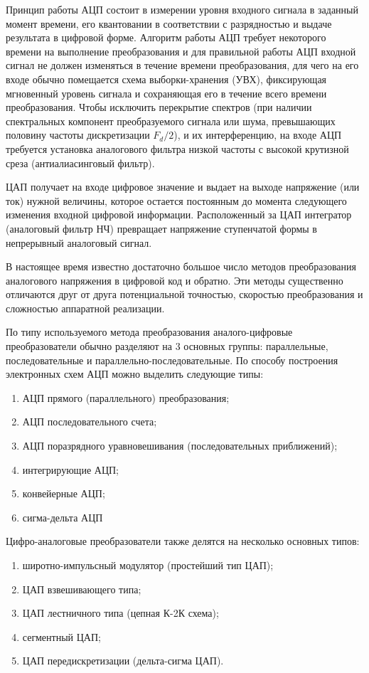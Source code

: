 Принцип работы АЦП состоит в измерении уровня входного сигнала в заданный момент времени, его квантовании в соответствии с разрядностью и выдаче результата в цифровой форме. Алгоритм работы АЦП требует некоторого времени на выполнение преобразования и для правильной работы АЦП входной сигнал не должен изменяться в течение времени преобразования, для чего на его входе обычно помещается схема выборки-хранения (УВХ), фиксирующая мгновенный уровень сигнала и сохраняющая его в течение всего времени преобразования. Чтобы исключить перекрытие спектров (при наличии спектральных компонент преобразуемого сигнала или шума, превышающих половину частоты дискретизации $F_d / 2$), и их интерференцию, на входе АЦП требуется установка аналогового фильтра низкой частоты с высокой крутизной среза (антиалиасинговый фильтр).

ЦАП получает на входе цифровое значение и выдает на выходе напряжение (или ток) нужной величины, которое остается постоянным до момента следующего изменения входной цифровой информации. Расположенный за ЦАП интегратор (аналоговый фильтр НЧ) превращает напряжение ступенчатой формы в непрерывный аналоговый сигнал.

В настоящее время известно достаточно большое число методов преобразования аналогового напряжения в цифровой код и обратно. Эти методы существенно отличаются друг от друга потенциальной точностью, скоростью преобразования и сложностью аппаратной реализации.

По типу используемого метода преобразования аналого-цифровые преобразователи обычно разделяют на 3 основных группы: параллельные, последовательные и параллельно-последовательные. По способу построения электронных схем АЦП можно выделить следующие типы:
%
\begin{enumerate}
\item АЦП прямого (параллельного) преобразования;
\item АЦП последовательного счета;
\item АЦП поразрядного уравновешивания (последовательных приближений);
\item интегрирующие АЦП;
\item конвейерные АЦП;
\item сигма-дельта АЦП
\end{enumerate}

Цифро-аналоговые преобразователи также делятся на несколько основных типов:
\begin{enumerate}
\item широтно-импульсный модулятор (простейший тип ЦАП);
\item ЦАП взвешивающего типа;
\item ЦАП лестничного типа (цепная К-2К схема);
\item сегментный ЦАП;
\item ЦАП передискретизации (дельта-сигма ЦАП).
\end{enumerate}

